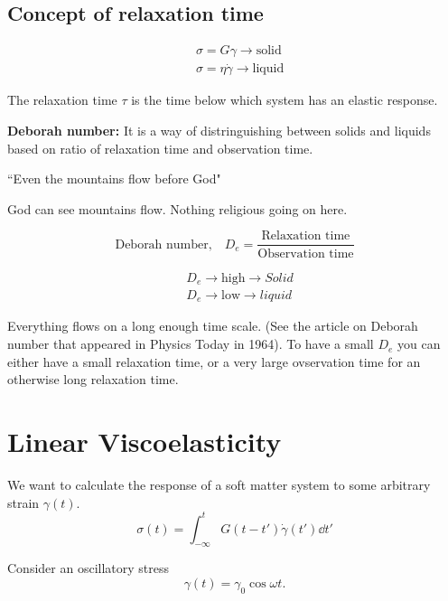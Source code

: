 \documentclass[a4paper]{article}
\begin{document}
\subsection*{Concept of relaxation time}
\begin{equation}
	\begin{split}
		&\sigma = G \gamma \to  \text{solid}\\
		&\sigma = \eta \dot{\gamma} \to \text{liquid}
	\end{split}
\end{equation}

The relaxation time $\tau$ is the time below which system has an
elastic response.

\textbf{Deborah number:} It is a way of distringuishing between
solids and liquids based on ratio of relaxation time and observation
time.

``Even the mountains flow before God"

God can see mountains flow. Nothing religious going on here.

\begin{equation}
	\text{Deborah number,}\quad D_e = \frac{\text{Relaxation time}}{\text{Observation time}}
\end{equation}

\begin{equation}
	\begin{split}
		&D_e \to  \text{high} \to Solid\\
		&D_e \to  \text{low} \to  liquid	
	\end{split}
\end{equation}

Everything flows on a long enough time scale. (See the article on Deborah number that
appeared in Physics Today in 1964). To have a small $D_e$ you can
either have a small relaxation time, or a very large ovservation time
for an otherwise long relaxation time.

\section*{Linear Viscoelasticity}
We want to calculate the response of a soft matter system to some
arbitrary strain $\gamma(t)$. 
\begin{equation}
	\sigma(t) = \int_{-\infty}^tG(t-t')\dot{\gamma}(t')\dd t'
\end{equation}

Consider an oscillatory stress \[
	\gamma(t) = \gamma_0 \cos\omega t
.\] 
\end{document}
